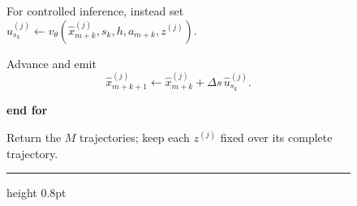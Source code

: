 \begin{figure}[t]
\begin{minipage}[t]{0.485\linewidth}
\begin{vsfalgorithmsteps}
\begin{vsfalgorithmsteps}
        \item[] For controlled inference, instead set
        $\widehat u_{s_k}^{(j)}\leftarrow
         v_\theta(\widehat x_{m+k}^{(j)},s_k,h,a_{m+k},z^{(j)})$.

        \item[] Advance and emit
        \[
          \widehat x_{m+k+1}^{(j)}\leftarrow
          \widehat x_{m+k}^{(j)}
          +\Delta s\,\widehat u_{s_k}^{(j)}.
        \]

      \end{vsfalgorithmsteps}
      \item[] \textbf{end for}
    \end{vsfalgorithmsteps}
    \noindent Return the $M$ trajectories; keep each $z^{(j)}$ fixed over
    its complete trajectory.
    \vspace{0.3em}\hrule height 0.8pt
  \end{minipage}
\end{figure}



\
